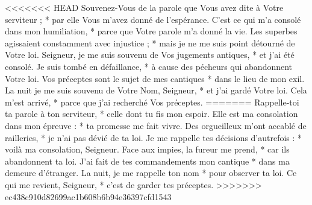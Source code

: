 <<<<<<< HEAD
Souvenez-Vous de la parole que Vous avez dite à Votre serviteur ; * par elle Vous m'avez donné de l'espérance.
\versseparator
C'est ce qui m'a consolé dans mon humiliation, * parce que Votre parole m'a donné la vie.
\versseparator
Les superbes agissaient constamment avec injustice ; * mais je ne me suis point détourné de Votre loi.
\versseparator
Seigneur, je me suis souvenu de Vos jugements antiques, * et j'ai été consolé.
\versseparator
Je suis tombé en défaillance, * à cause des pécheurs qui abandonnent Votre loi.
\versseparator
Vos préceptes sont le sujet de mes cantiques * dans le lieu de mon exil.
\versseparator
La nuit je me suis souvenu de Votre Nom, Seigneur, * et j'ai gardé Votre loi.
\versseparator
Cela m'est arrivé, * parce que j'ai recherché Vos préceptes.
=======
Rappelle-toi ta parole à ton serviteur, *
celle dont tu fis mon espoir.
\versseparator
Elle est ma consolation dans mon épreuve : *
ta promesse me fait vivre.
\versseparator
Des orgueilleux m’ont accablé de railleries, *
je n’ai pas dévié de ta loi.
\versseparator
Je me rappelle tes décisions d’autrefois : *
voilà ma consolation, Seigneur.
\versseparator
Face aux impies, la fureur me prend, *
car ils abandonnent ta loi.
\versseparator
J’ai fait de tes commandements mon cantique *
dans ma demeure d’étranger.
\versseparator
La nuit, je me rappelle ton nom *
pour observer ta loi.
\versseparator
Ce qui me revient, Seigneur, *
c’est de garder tes préceptes.
>>>>>>> ec438c910d82699ac1b608b6b94e36397cfd1543
